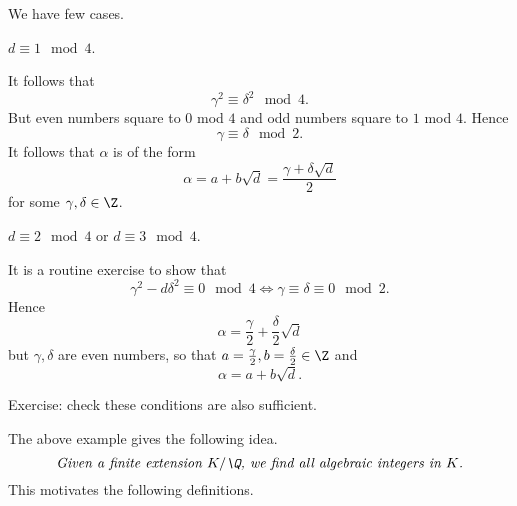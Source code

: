 \documentclass[pmath441]{subfiles}
\begin{document}
\begin{example}{}
        We have few cases.

        \begin{case}
            $d\equiv 1\mod 4$.

            It follows that
            \begin{equation*}
                \gamma^{2} \equiv \delta^{2} \mod 4.
            \end{equation*}
            But even numbers square to $0$ mod $4$ and odd numbers square to $1$ mod $4$. Hence
            \begin{equation*}
                \gamma \equiv \delta \mod 2.
            \end{equation*}
            It follows that $\alpha$ is of the form
            \begin{equation*}
                \alpha = a+b\sqrt{d} = \frac{\gamma+\delta\sqrt{d}}{2}
            \end{equation*}
            for some $\gamma,\delta\in\Z$.
        \end{case}

        \begin{case}
            $d\equiv 2\mod 4$ or $d\equiv 3\mod 4$.

            It is a routine exercise to show that
            \begin{equation*}
                \gamma^{2}-d\delta^{2} \equiv 0 \mod 4 \iff \gamma \equiv \delta \equiv 0 \mod 2.
            \end{equation*}
            Hence
            \begin{equation*}
                \alpha = \frac{\gamma}{2} + \frac{\delta}{2} \sqrt{d}
            \end{equation*}
            but $\gamma,\delta$ are even numbers, so that $a=\frac{\gamma}{2},b=\frac{\delta}{2}\in\Z$ and
            \begin{equation*}
                \alpha = a+b\sqrt{d}.
            \end{equation*}
        \end{case}

        Exercise: check these conditions are also sufficient.
    \end{example}

    \rruleline
    
    \np The above example gives the following idea.
    \begin{equation*}
        \text{\textit{Given a finite extension $K /\Q$, we find all algebraic integers in $K$.}}
    \end{equation*}
    This motivates the following definitions.
\end{document}
